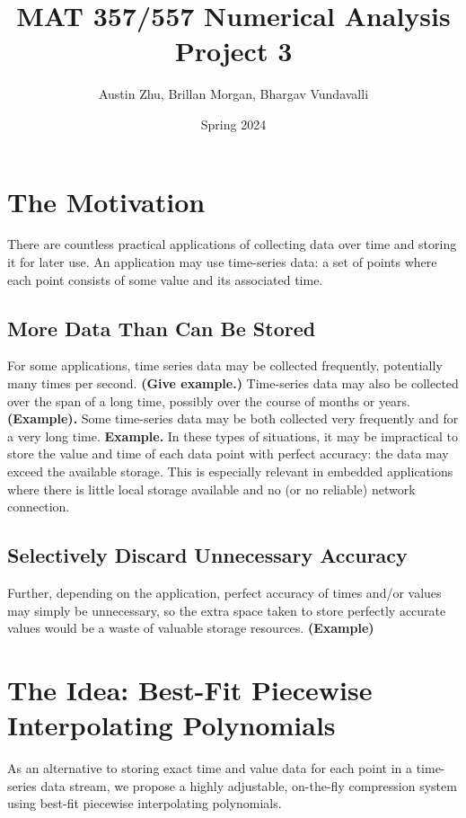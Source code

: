 \documentclass{article}
\title{MAT 357/557 Numerical Analysis Project 3}
\author{Austin Zhu, Brillan Morgan, Bhargav Vundavalli}
\date{Spring 2024}
\begin{document}
\maketitle



\section{The Motivation}
\label{sec:the_motivation}
There are countless practical applications of collecting data over time and storing it for later use. An application may use time-series data: a set of points where each point consists of some value and its associated time.

\subsection{More Data Than Can Be Stored}
\label{subsec:practical_applications}
For some applications, time series data may be collected frequently, potentially many times per second. \textbf{(Give example.) } Time-series data may also be collected over the span of a long time, possibly over the course of months or years. \textbf{(Example). } Some time-series data may be both collected very frequently and for a very long time. \textbf{Example.} In these types of situations, it may be impractical to store the value and time of each data point with perfect accuracy: the data may exceed the available storage. This is especially relevant in embedded applications where there is little local storage available and no (or no reliable) network connection.

\subsection{Selectively Discard Unnecessary Accuracy}
\label{subsec:unnecessary_accuracy}
Further, depending on the application, perfect accuracy of times and/or values may simply be unnecessary, so the extra space taken to store perfectly accurate values would be a waste of valuable storage resources. \textbf{(Example)}

\section{The Idea: Best-Fit Piecewise Interpolating Polynomials}
\label{sec:the_idea}
As an alternative to storing exact time and value data for each point in a time-series data stream, we propose a highly adjustable, on-the-fly compression system using best-fit piecewise interpolating polynomials.
\end{document}
